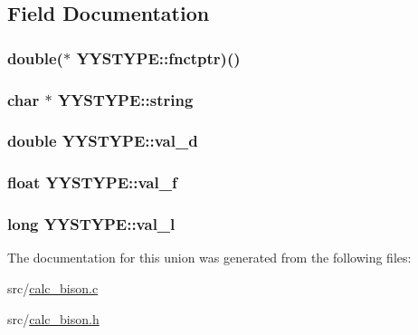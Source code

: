 \subsection{Field Documentation}
\hypertarget{unionYYSTYPE_a2ede02959c9774fe63cc959095e4a50f}{
\subsubsection[{fnctptr}]{\setlength{\rightskip}{0pt plus 5cm}double($\ast$ Y\+Y\+S\+T\+Y\+P\+E\+::fnctptr)()}}\label{unionYYSTYPE_a2ede02959c9774fe63cc959095e4a50f}
\hypertarget{unionYYSTYPE_a0138efb4387041e915681aff6dfd68ff}{
\subsubsection[{string}]{\setlength{\rightskip}{0pt plus 5cm}char $\ast$ Y\+Y\+S\+T\+Y\+P\+E\+::string}}\label{unionYYSTYPE_a0138efb4387041e915681aff6dfd68ff}
\hypertarget{unionYYSTYPE_a61bc717a8d5bde0979541eb670984140}{
\subsubsection[{val\+\_\+d}]{\setlength{\rightskip}{0pt plus 5cm}double Y\+Y\+S\+T\+Y\+P\+E\+::val\+\_\+d}}\label{unionYYSTYPE_a61bc717a8d5bde0979541eb670984140}
\hypertarget{unionYYSTYPE_a6f4050b34641ae09204f63c853cb4c92}{
\subsubsection[{val\+\_\+f}]{\setlength{\rightskip}{0pt plus 5cm}float Y\+Y\+S\+T\+Y\+P\+E\+::val\+\_\+f}}\label{unionYYSTYPE_a6f4050b34641ae09204f63c853cb4c92}
\hypertarget{unionYYSTYPE_a81f209066080f5ffa329c1772b8b70c5}{
\subsubsection[{val\+\_\+l}]{\setlength{\rightskip}{0pt plus 5cm}long Y\+Y\+S\+T\+Y\+P\+E\+::val\+\_\+l}}\label{unionYYSTYPE_a81f209066080f5ffa329c1772b8b70c5}


The documentation for this union was generated from the following files\+:\begin{DoxyCompactItemize}
\item 
src/\hyperlink{calc__bison_8c}{calc\+\_\+bison.\+c}\item 
src/\hyperlink{calc__bison_8h}{calc\+\_\+bison.\+h}\end{DoxyCompactItemize}
